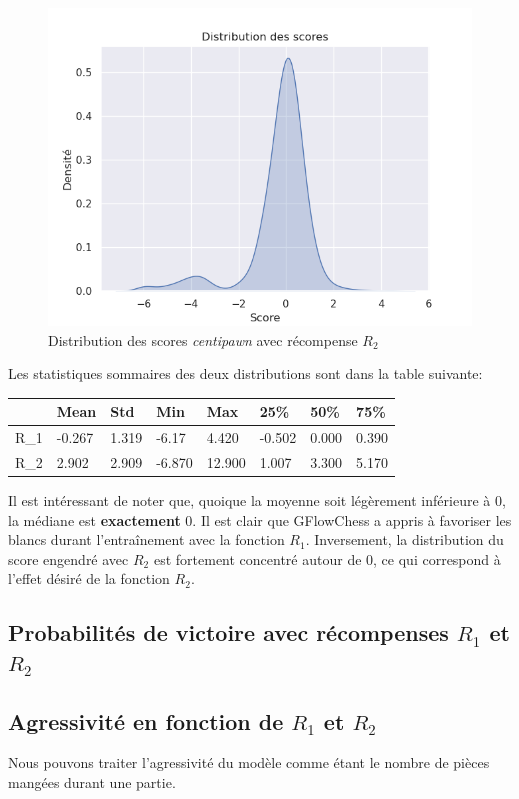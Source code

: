 \documentclass[11pt]{article}
\begin{document}
\begin{figure}[H]
  \centering \includegraphics[scale=0.5]{kdescoreegaux.png}
  \caption{Distribution des scores \textit{centipawn} avec récompense $R_{2}$}
	\label{kdescoreegaux}
\end{figure}
Les statistiques sommaires des deux distributions sont dans la table suivante:

\begin{table}[!ht]
    \centering
    \begin{tabular}{|l|l|l|l|l|l|l|l|}
    \hline
        ~ & Mean & Std & Min & Max & 25\% & 50\% & 75\% \\ \hline
        R\_1 & -0.267 & 1.319 & -6.17 & 4.420 & -0.502 & 0.000 & 0.390 \\ \hline
        R\_2 & 2.902 & 2.909 & -6.870 & 12.900 & 1.007 & 3.300 & 5.170 \\ \hline
    \end{tabular}
\end{table}
Il est intéressant de noter que, quoique la moyenne soit légèrement
inférieure à 0, la médiane est \textbf{exactement} 0. Il est clair que
GFlowChess a appris à favoriser les blancs durant l'entraînement avec
la fonction $R_{1}$. Inversement, la distribution du score engendré
avec $R_{2}$ est fortement concentré autour de 0, ce qui correspond à
l'effet désiré de la fonction $R_{2}$.
\subsection*{Probabilités de victoire avec récompenses $R_{1}$ et $R_{2}$}

\subsection*{Agressivité en fonction de $R_{1}$ et $R_{2}$}
Nous pouvons traiter l'agressivité du modèle comme étant le nombre de
pièces mangées durant une partie. 
 

\appendix
\end{document}
